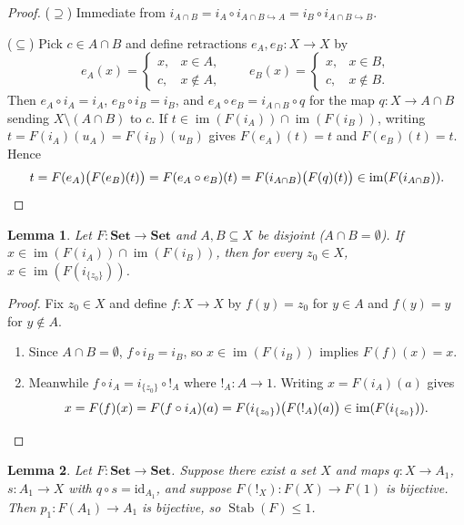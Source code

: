 \documentclass[11pt,a4paper]{article}
\theoremstyle{plain}
\newtheorem{lemma}{Lemma}[section]
\newcommand{\Stab}{\operatorname{Stab}}
\newcommand{\im}{\operatorname{im}}
\newcommand{\id}{\mathrm{id}}
\newcommand{\Set}{\mathbf{Set}}
\begin{document}
\begin{proof}
($\supseteq$) Immediate from $i_{A \cap B} = i_A \circ i_{A\cap B \hookrightarrow A} = i_B \circ i_{A\cap B \hookrightarrow B}$.

($\subseteq$) Pick $c \in A \cap B$ and define retractions $e_A, e_B : X \to X$ by
\[
  e_A(x) = \begin{cases} x, & x \in A, \\ c, & x \notin A, \end{cases}
  \qquad
  e_B(x) = \begin{cases} x, & x \in B, \\ c, & x \notin B. \end{cases}
\]
Then $e_A \circ i_A = i_A$, $e_B \circ i_B = i_B$, and $e_A \circ e_B = i_{A \cap B} \circ q$ for the map $q : X \to A \cap B$ sending $X \setminus (A \cap B)$ to $c$. If $t \in \im(F(i_A)) \cap \im(F(i_B))$, writing $t = F(i_A)(u_A) = F(i_B)(u_B)$ gives $F(e_A)(t) = t$ and $F(e_B)(t) = t$. Hence
\[
  t = F(e_A)\bigl(F(e_B)(t)\bigr) = F(e_A \circ e_B)(t) = F(i_{A \cap B})\bigl(F(q)(t)\bigr) \in \im(F(i_{A \cap B})). \qedhere
\]
\end{proof}

\begin{lemma}
Let $F : \Set \to \Set$ and $A, B \subseteq X$ be disjoint ($A \cap B = \emptyset$). If $x \in \im(F(i_A)) \cap \im(F(i_B))$, then for every $z_0 \in X$, $x \in \im(F(i_{\{z_0\}}))$.
\end{lemma}

\begin{proof}
Fix $z_0 \in X$ and define $f : X \to X$ by $f(y) = z_0$ for $y \in A$ and $f(y) = y$ for $y \notin A$.
\begin{enumerate}[label=(\arabic*)]
  \item Since $A \cap B = \emptyset$, $f \circ i_B = i_B$, so $x \in \im(F(i_B))$ implies $F(f)(x) = x$.
  \item Meanwhile $f \circ i_A = i_{\{z_0\}} \circ {!}_A$ where ${!}_A : A \to 1$. Writing $x = F(i_A)(a)$ gives
    \[
      x = F(f)(x) = F(f \circ i_A)(a) = F(i_{\{z_0\}})\bigl(F({!}_A)(a)\bigr) \in \im(F(i_{\{z_0\}})). \qedhere
    \]
\end{enumerate}
\end{proof}

\begin{lemma}
Let $F : \Set \to \Set$. Suppose there exist a set $X$ and maps $q : X \to A_1$, $s : A_1 \to X$ with $q \circ s = \id_{A_1}$, and suppose $F({!}_X) : F(X) \to F(1)$ is bijective. Then $p_1 : F(A_1) \to A_1$ is bijective, so $\Stab(F) \le 1$.
\end{lemma}
\end{document}
